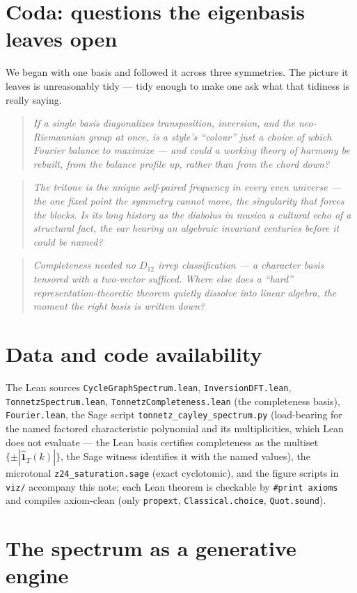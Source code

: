 \documentclass[11pt]{article}
\newcommand{\lean}[1]{\texttt{#1}}
\newcommand{\qlink}[1]{\par\medskip\begin{quote}\itshape\small\color{ctB!88!black}#1\end{quote}\medskip}
\begin{document}
\section*{Coda: questions the eigenbasis leaves open}
We began with one basis and followed it across three symmetries. The picture it leaves is unreasonably tidy
--- tidy enough to make one ask what that tidiness is really saying.

\qlink{If a single basis diagonalizes transposition, inversion, \emph{and} the neo-Riemannian group at once,
is a style's ``colour'' just a choice of which Fourier balance to maximize --- and could a working theory of
harmony be rebuilt, from the balance profile up, rather than from the chord down?}

\qlink{The tritone is the unique self-paired frequency in every even universe --- the one fixed point the
symmetry cannot move, the singularity that forces the blocks. Is its long history as the
\emph{diabolus in musica} a cultural echo of a structural fact, the ear hearing an algebraic invariant
centuries before it could be named?}

\qlink{Completeness needed no $D_{12}$ irrep classification --- a character basis tensored with a
two-vector sufficed. Where else does a ``hard'' representation-theoretic theorem quietly dissolve into linear
algebra, the moment the right basis is written down?}

\section*{Data and code availability}
\begin{sloppypar}
The Lean sources \lean{CycleGraphSpectrum.lean}, \lean{InversionDFT.lean}, \lean{TonnetzSpectrum.lean},
\lean{TonnetzCompleteness.lean} (the completeness basis), \lean{Fourier.lean}, the Sage script
\lean{tonnetz\_cayley\_spectrum.py} (load-bearing for the named factored characteristic polynomial and its
multiplicities, which Lean does not evaluate --- the Lean basis certifies completeness as the multiset
$\{\pm|\hat{\mathbf 1}_T(k)|\}$, the Sage witness identifies it with the named values), the microtonal
\lean{z24\_saturation.sage} (exact cyclotomic), and the figure scripts in \lean{viz/} accompany this note; each Lean theorem is checkable by
\lean{\#print axioms} and compiles axiom-clean (only \lean{propext}, \lean{Classical.choice},
\lean{Quot.sound}).
\end{sloppypar}

\appendix
\section{The spectrum as a generative engine}
\label{app:compose}
\end{document}
